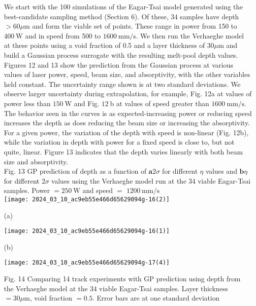 \documentclass[10pt]{article}
\begin{document}
We start with the 100 simulations of the Eagar-Tsai model generated using the best-candidate sampling method (Section 6). Of these, 34 samples have depth $>60 \mu \mathrm{m}$ and form the viable set of points. These range in power from 150 to $400 \mathrm{~W}$ and in speed from 500 to $1600 \mathrm{~mm} / \mathrm{s}$. We then run the Verhaeghe model at these points using a void fraction of 0.5 and a layer thickness of $30 \mu \mathrm{m}$ and build a Gaussian process surrogate with the resulting melt-pool depth values.\\
Figures 12 and 13 show the prediction from the Gaussian process at various values of laser power, speed, beam size, and absorptivity, with the other variables held constant. The uncertainty range shown is at two standard deviations. We observe larger uncertainty during extrapolation, for example, Fig. 12a at values of power less than $150 \mathrm{~W}$ and Fig. $12 \mathrm{~b}$ at values of speed greater than $1600 \mathrm{~mm} / \mathrm{s}$. The behavior seen in the curves is as expected-increasing power or reducing speed increases the depth as does reducing the beam size or increasing the absorptivity. For a given power, the variation of the depth with speed is non-linear (Fig. 12b), while the variation in depth with power for a fixed speed is close to, but not quite, linear. Figure 13 indicates that the depth varies linearly with both beam size and absorptivity.\\
Fig. 13 GP prediction of depth as a function of $\mathbf{a} 2 \sigma$ for different $\eta$ values and $\mathbf{b} \eta$ for different $2 \sigma$ values using the Verhaeghe model run at the 34 viable Eagar-Tsai samples. Power $=250 \mathrm{~W}$ and speed $=$ $1200 \mathrm{~mm} / \mathrm{s}$\\
\texttt{[image: 2024\_03\_10\_ac9eb55e466d65629094g-16(2)]}

(a)

\begin{center}
\texttt{[image: 2024\_03\_10\_ac9eb55e466d65629094g-16(1)]}
\end{center}

(b)

\begin{center}
\texttt{[image: 2024\_03\_10\_ac9eb55e466d65629094g-17(4)]}
\end{center}

Fig. 14 Comparing 14 track experiments with GP prediction using depth from the Verhaeghe model at the 34 viable Eagar-Tsai samples. Layer thickness $=30 \mu \mathrm{m}$, void fraction $=0.5$. Error bars are at one standard deviation
\end{document}
